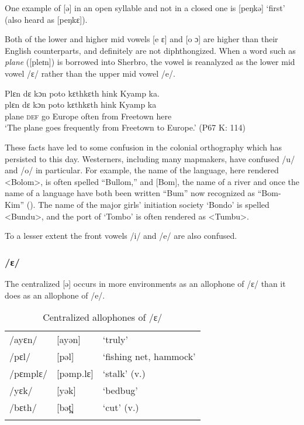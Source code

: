 One example of [ə] in an open syllable and not in a closed one is [peŋkə] ‘first' (also heard as [peŋkɛ]).

Both of the lower and higher mid vowels [e ɛ] and [o ɔ] are higher than their English counterparts, and definitely are not diphthongized. When a word such as \textit{plane} ([pleɪn]) is borrowed into Sherbro, the vowel is reanalyzed as the lower mid vowel /ɛ/ rather than the upper mid vowel /e/.

\ea %
\label{ex:15}
Plɛn dɛ kɔn poto kɛthkɛth hink Kyamp ka.\\
\gll plɛn  dɛ    kɔn  poto    kɛthkɛth    hink  Kyamp    ka\\
plane \textsc{def}  go    Europe  often      from  Freetown  here\\
\glt ‘The plane goes frequently from Freetown to Europe.' (P67 K: 114)
\z

These facts have led to some confusion in the colonial orthography which has persisted to this day. Westerners, including many mapmakers, have confused /u/ and /o/ in particular. For example, the name of the language, here rendered <Bolom>, is often spelled “Bullom,” and [Bom], the name of a river and once the name of a language have both been written “Bum” now recognized as “Bom-Kim” (\citealt{Childs2020}). The name of the major girls' initiation society ‘Bondo' is spelled <Bundu>, and the port of ‘Tombo' is often rendered as <Tumbu>.

To a lesser extent the front vowels /i/ and /e/ are also confused.

\subsubsection{/ɛ/}
\label{sec:2.1.1.3}
The centralized [ə] occurs in more environments as an allophone of /ɛ/ than it does as an allophone of /e/.

\begin{table}
\caption{\label{tab:phon:8}Centralized allophones of /ɛ/}

\begin{tabular}{lll}
\lsptoprule
/ayɛn/ & [ayən] & ‘truly'\\
/pɛl/ & [pəl] & ‘fishing net, hammock'\\
/pɛmplɛ/ & [pəmp.lɛ] & ‘stalk' (v.)\\
/yɛk/ & [yək] & ‘bedbug' \\
/bɛth/ & [bət̪] & ‘cut' (v.)\\
\lspbottomrule
\end{tabular}
\end{table}

